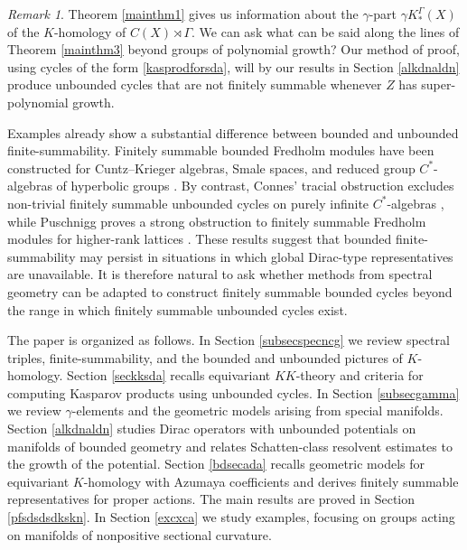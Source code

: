 \documentclass[a4paper,reqno]{amsart}
\numberwithin{equation}{section}
\theoremstyle{definition}
\theoremstyle{remark}
\newtheorem{remark*}[thm*]{Remark}
\begin{document}
\begin{remark*}
Theorem \ref{mainthm1} gives us information about the $\gamma$-part $\gamma K_*^\Gamma(X)$ of the $K$-homology of $C(X)\rtimes \Gamma$. We can ask what can be said along the lines of Theorem \ref{mainthm3} beyond groups of polynomial growth? Our method of proof, using cycles of the form \eqref{kasprodforsda}, will by our results in Section \ref{alkdnaldn} produce unbounded cycles that are not finitely summable whenever $Z$ has super-polynomial growth. 

Examples already show a substantial difference between bounded and unbounded finite-summability. Finitely summable bounded Fredholm modules have been constructed for Cuntz--Krieger algebras, Smale spaces, and reduced group $C^*$-algebras of hyperbolic groups \cite{EN, Ger,GM15}. By contrast, Connes' tracial obstruction excludes non-trivial finitely summable unbounded cycles on purely infinite $C^*$-algebras \cite{ConnesETDS,GRU}, while Puschnigg proves a strong obstruction to finitely summable Fredholm modules for higher-rank lattices \cite{Pusch}. These results suggest that bounded finite-summability may persist in situations in which global Dirac-type representatives are unavailable. It is therefore natural to ask whether methods from spectral geometry can be adapted to construct finitely summable bounded cycles beyond the range in which finitely summable unbounded cycles exist.
\end{remark*}

The paper is organized as follows. In Section \ref{subsecspecncg} we review spectral triples, finite-summability, and the bounded and unbounded pictures of $K$-homology. Section \ref{seckksda} recalls equivariant $KK$-theory and criteria for computing Kasparov products using unbounded cycles. In Section \ref{subsecgamma} we review $\gamma$-elements and the geometric models arising from special manifolds. Section \ref{alkdnaldn} studies Dirac operators with unbounded potentials on manifolds of bounded geometry and relates Schatten-class resolvent estimates to the growth of the potential. Section \ref{bdsecada} recalls geometric models for equivariant $K$-homology with Azumaya coefficients and derives finitely summable representatives for proper actions. The main results are proved in Section \ref{pfsdsdsdkskn}. In Section \ref{excxca} we study examples,  focusing on groups acting on manifolds of nonpositive sectional curvature.
\end{document}
